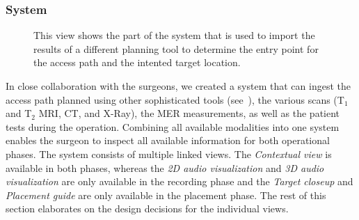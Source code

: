 \subsubsection{System}
\label{contributions:medbio:dbs:system}
\begin{figure}
\caption{This view shows the part of the system that is used to import the results of a different planning tool to determine the entry point for the access path and the intented target location.}
\label{contributions:medbio:dbs:planning}
\end{figure}

In close collaboration with the surgeons, we created a system that can ingest the access path planned using other sophisticated tools (see~), the various scans (T$_1$ and T$_2$ MRI, CT, and X-Ray), the MER measurements, as well as the patient tests during the operation. Combining all available modalities into one system enables the surgeon to inspect all available information for both operational phases. The system consists of multiple linked views. The \emph{Contextual view} is available in both phases, whereas the \emph{2D audio visualization} and \emph{3D audio visualization} are only available in the recording phase and the \emph{Target closeup} and \emph{Placement guide} are only available in the placement phase. The rest of this section elaborates on the design decisions for the individual views.

